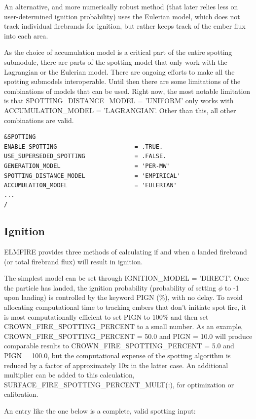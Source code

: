 An alternative, and more numerically robust method (that later relies less on user-determined ignition probability) uses the Eulerian model, which does not track individual firebrands for ignition, but rather keeps track of the ember flux into each area.

As the choice of accumulation model is a critical part of the entire spotting submodule, there are parts of the spotting model that only work with the Lagrangian or the Eulerian model. There are ongoing efforts to make all the spotting submodels interoperable. Until then there are some limitations of the combinations of models that can be used. Right now, the most notable limitation is that SPOTTING\_DISTANCE\_MODEL = 'UNIFORM' only works with ACCUMULATION\_MODEL = 'LAGRANGIAN'. Other than this, all other combinations are valid. 

\begin{verbatim}
&SPOTTING
ENABLE_SPOTTING 					 = .TRUE.
USE_SUPERSEDED_SPOTTING 			 = .FALSE.
GENERATION_MODEL                     = 'PER-MW'
SPOTTING_DISTANCE_MODEL              = 'EMPIRICAL'
ACCUMULATION_MODEL                   = 'EULERIAN'
...
/
\end{verbatim}

\subsection{Ignition}
\label{ember_ignition}

ELMFIRE provides three methods of calculating if and when a landed firebrand (or total firebrand flux) will result in ignition. 

The simplest model can be set through IGNITION\_MODEL = 'DIRECT'. Once the particle has landed, the ignition probability (probability of setting $\phi$ to -1 upon landing) is controlled by the keyword PIGN (\%), with no delay. To avoid allocating computational time to tracking embers that don’t initiate spot fire, it is most computationally efficient to set PIGN to 100\% and then set CROWN\_FIRE\_SPOTTING\_PERCENT to a small number. As an example, CROWN\_FIRE\_SPOTTING\_PERCENT = 50.0 and PIGN = 10.0 will produce comparable results to CROWN\_FIRE\_SPOTTING\_PERCENT = 5.0 and PIGN = 100.0, but the computational expense of the spotting algorithm is reduced by a factor of approximately 10x in the latter case. An additional multiplier can be added to this calculation, SURFACE\_FIRE\_SPOTTING\_PERCENT\_MULT(:), for optimization or calibration.

An entry like the one below is a complete, valid spotting input:

